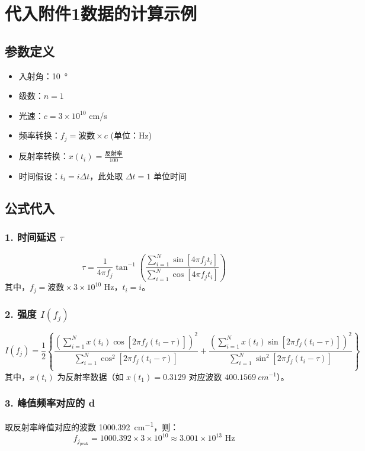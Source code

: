 \documentclass[withoutpreface,bwprint]{cumcmthesis}
\begin{document}
\section*{代入附件1数据的计算示例}

\subsection*{参数定义}
\begin{itemize}
  \item 入射角：\SI{10}{\degree}
  \item 级数：\( n = 1 \)
  \item 光速：\( c = 3 \times 10^{10} \) cm/s
  \item 频率转换：\( f_j = \text{波数} \times c \) (单位：Hz)
  \item 反射率转换：\( x(t_i) = \frac{\text{反射率}}{100} \)
  \item 时间假设：\( t_i = i \Delta t \)，此处取 \( \Delta t = 1 \) 单位时间
\end{itemize}

\subsection*{公式代入}
\subsubsection*{1. 时间延迟 \( \tau \)}
\begin{equation}
\tau = \frac{1}{4\pi f_j} \tan^{-1}\left( \frac{\sum_{i=1}^{N} \sin[4\pi f_j t_i]}{\sum_{i=1}^{N} \cos[4\pi f_j t_i]} \right)
\end{equation}
其中，\( f_j = \text{波数} \times 3 \times 10^{10} \) Hz，\( t_i = i \)。

\subsubsection*{2. 强度 \( I(f_j) \)}
\begin{equation}
I(f_j) = \frac{1}{2} \left\{ \frac{\left( \sum_{i=1}^{N} x(t_i) \cos[2\pi f_j (t_i - \tau)] \right)^2}{\sum_{i=1}^{N} \cos^2[2\pi f_j (t_i - \tau)]} + \frac{\left( \sum_{i=1}^{N} x(t_i) \sin[2\pi f_j (t_i - \tau)] \right)^2}{\sum_{i=1}^{N} \sin^2[2\pi f_j (t_i - \tau)]} \right\}
\end{equation}
其中，\( x(t_i) \) 为反射率数据（如 \( x(t_1) = 0.3129 \) 对应波数 $\SI{400.1569}{cm^{-1}}$）。

\subsubsection*{3. 峰值频率对应的 d}
取反射率峰值对应的波数 \SI{1000.392}{cm^{-1}}，则：
\begin{equation}
f_{j_{\text{peak}}} = 1000.392 \times 3 \times 10^{10} \approx 3.001 \times 10^{13} \text{ Hz}
\end{equation}
\end{document}
